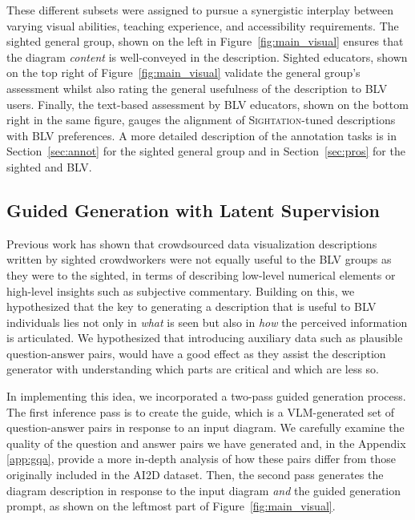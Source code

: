 These different subsets were assigned to pursue a synergistic interplay between varying visual abilities, teaching experience, and accessibility requirements. The sighted general group, shown on the left in Figure~\ref{fig:main_visual} ensures that the diagram \textit{content} is well-conveyed in the description. Sighted educators, shown on the top right of Figure~\ref{fig:main_visual} validate the general group's assessment whilst also rating the general usefulness of the description to BLV users. Finally, the text-based assessment by BLV educators, shown on the bottom right in the same figure, gauges the alignment of \textsc{Sightation}-tuned descriptions with BLV preferences. A more detailed description of the annotation tasks is in Section~\ref{sec:annot} for the sighted general group and in Section~\ref{sec:pros} for the sighted and BLV.

\subsection{Guided Generation with Latent Supervision}\label{sec:guide}

Previous work \citep{9555469} has shown that crowdsourced data visualization descriptions written by sighted crowdworkers were not equally useful to the BLV groups as they were to the sighted, in terms of describing low-level numerical elements or high-level insights such as subjective commentary. Building on this, we hypothesized that the key to generating a description that is useful to BLV individuals lies not only in \textit{what} is seen but also in \textit{how} the perceived information is articulated. We hypothesized that introducing auxiliary data such as plausible question-answer pairs, would have a good effect as they assist the description generator with understanding which parts are critical and which are less so.

In implementing this idea, we incorporated a two-pass guided generation process. The first inference pass is to create the guide, which is a VLM-generated set of question-answer pairs in response to an input diagram. We carefully examine the quality of the question and answer pairs we have generated and, in the Appendix \ref{app:gqa}, provide a more in-depth analysis of how these pairs differ from those originally included in the AI2D dataset. Then, the second pass generates the diagram description in response to the input diagram \textit{and} the guided generation prompt, as shown on the leftmost part of Figure~\ref{fig:main_visual}. 

